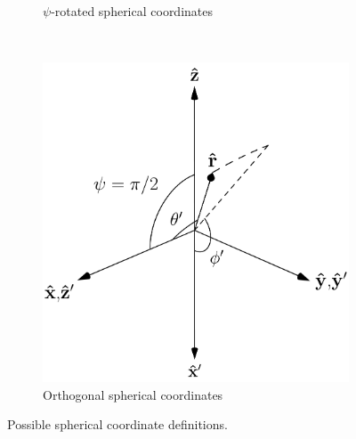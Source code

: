 \documentclass[11pt]{article}
\begin{document}
\begin{figure}[h]
\begin{subfigure}[t]{0.33\textwidth}
   \caption{$\psi$-rotated spherical coordinates}
   \label{fig:frames_b}
 \end{subfigure}%
 ~
 \begin{subfigure}[t]{0.33\textwidth}
   \centering
   \includegraphics[width = 1.0\textwidth]{../figures/frame_c.pdf}
   \caption{Orthogonal spherical coordinates}
   \label{fig:frames_c}
 \end{subfigure}%
 \caption{Possible spherical coordinate definitions.}
 \label{fig:frames}
\end{figure}
\end{document}
